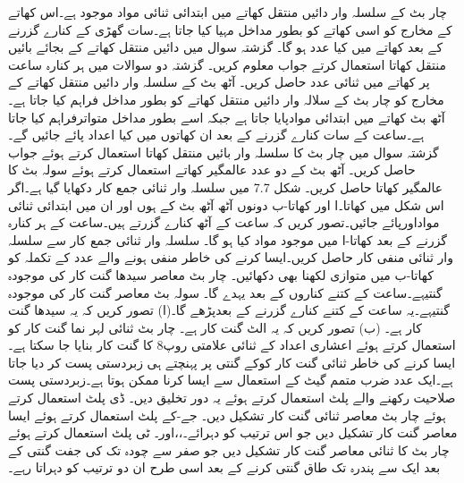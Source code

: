  چار بٹ کے سلسلہ وار دائیں منتقل کھاتے میں ابتدائی ثنائی مواد موجود ہے۔اس کھاتے کے مخارج کو اسی کھاتے کو بطور مداخل مہیا کیا جاتا ہے۔سات گھڑی کے کنارے گزرنے کے بعد کھاتے میں کیا عدد ہو گا۔
  گزشتہ سوال میں دائیں منتقل کھاتے کے بجائے بائیں منتقل کھاتا استعمال کرتے جواب معلوم کریں۔
 گزشتہ دو سوالات میں ہر کنارہ ساعت پر کھاتے میں ثنائی عدد حاصل کریں۔
 آٹھ بٹ کے سلسلہ وار دائیں منتقل کھاتے کے مخارج کو چار بٹ کے سلالہ وار دائیں منتقل کھاتے کو بطور مداخل فراہم کیا جاتا ہے۔آٹھ بٹ کھاتے میں ابتدائی موادپایا جاتا ہے جبکہ اسے بطور مداخل متواترفراہم کیا جاتا ہے۔ساعت کے سات کنارے گزرنے کے بعد ان کھاتوں میں کیا اعداد پائے جائیں گے۔
 گزشتہ سوال میں چار بٹ کا سلسلہ وار بائیں منتقل کھاتا استعمال کرتے  ہوئے جواب حاصل کریں۔
 آٹھ بٹ کے دو عدد عالمگیر کھاتے استعمال کرتے ہوئے سولہ بٹ کا عالمگیر کھاتا حاصل کریں۔
 شکل 7.7 میں سلسلہ وار ثنائی جمع کار دکھایا گیا ہے۔اگر اس شکل میں کھاتا۔ا اور کھاتا-ب دونوں آٹھ آٹھ بٹ کے ہوں اور ان میں ابتدائی ثنائی مواداورپائے جائیں۔تصور کریں کہ ساعت کے آٹھ کنارے گزرتے ہیں۔ساعت کے ہر کنارہ گزرنے کے بعد کھاتا-ا میں موجود مواد کیا ہو گا۔
 سلسلہ وار ثنائی جمع کار سے سلسلہ وار ثنائی منفی کار حاصل کریں۔ایسا کرنے کی خاطر منفی ہونے والے عدد کے تکملہ کو کھاتا-ب میں متوازی لکھنا بھی دکھائیں۔
 چار بٹ معاصر سیدھا گنت کار کی موجودہ گنتیہے۔ساعت کے کتنے کناروں کے بعد یہدے گا۔
 سولہ بٹ معاصر گنت کار کی موجودہ گنتیہے۔یہ ساعت کے کتنے کنارے گزرنے کے بعدپڑھے گا۔(ا) تصور کریں کہ یہ سیدھا گنت کار ہے۔ (ب) تصور کریں کہ یہ الٹ گنت کار ہے۔
 چار بٹ ثنائی لہر نما گنت کار کو استعمال کرتے ہوئے اعشاری اعداد کے ثنائی علامتی روپ8 کا گنت کار بنایا جا سکتا ہے۔ایسا کرنے کی خاطر ثنائی گنت کار کوکے گنتی پر پہنچتے ہی زبردستی پست کر دیا جاتا ہے۔ایک عدد ضرب متمم گیٹ کے استعمال سے ایسا کرنا ممکن ہوتا ہے۔زبردستی پست صلاحیت رکھنے والے پلٹ استعمال کرتے ہوئے یہ دور تخلیق دیں۔ 
 ڈی پلٹ استعمال کرتے ہوئے چار بٹ معاصر ثنائی گنت کار تشکیل دیں۔ 
 جے-کے پلٹ استعمال کرتے ہوئے ایسا معاصر گنت کار تشکیل دیں جو اس ترتیب کو دہرائے۔،،اور۔
 ٹی پلٹ استعمال کرتے ہوئے چار بٹ کا ثنائی معاصر گنت کار تشکیل دیں جو صفر سے چودہ تک کی جفت گنتی کے بعد ایک سے پندرہ تک طاق گنتی کرنے کے بعد اسی طرح ان دو ترتیب کو دہراتا رہے۔
